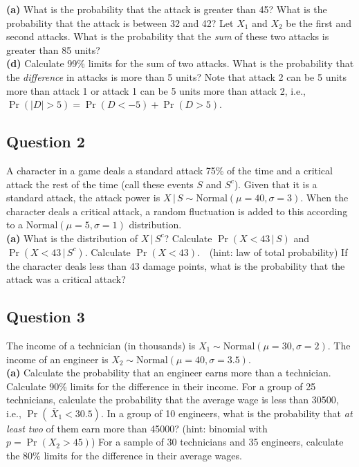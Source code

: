 {\bf(a)} What is the probability that the attack is greater than 45?  What is the probability that the attack is between 32 and 42?  Let $X_1$ and $X_2$ be the first and second attacks. What is the probability that the \emph{sum} of these two attacks is greater than 85 units? \quad \\{\bf(d)} Calculate 99\% limits for the sum of two attacks.   What is the probability that the \emph{difference} in attacks is more than 5 units? Note that attack 2 can be 5 units more than attack 1 or attack 1 can be 5 units more than attack 2, i.e., $\Pr(|D|>5)=\Pr(D<-5) + \Pr(D>5)$.



\subsection*{Question 2}

A character in a game deals a standard attack 75\% of the time and a critical attack the rest of the time (call these events $S$ and $S^c$). Given that it is a standard attack, the attack power is $X\,|\,S \sim \text{Normal}(\mu=40,\sigma=3)$. When the character deals a critical attack, a random fluctuation is added to this according to a $\text{Normal}(\mu=5,\sigma=1)$ distribution.\\[-0.2cm]

{\bf(a)} What is the distribution of $X\,|\,S^c$?  Calculate $\Pr(X<43\,|\,S)$ and $\Pr(X<43\,|\,S^c)$.  Calculate $\Pr(X<43)$. \,\, (hint: law of total probability)  If the character deals less than 43 damage points, what is the probability that the attack was a critical attack?



\subsection*{Question 3}
The income of a technician (in thousands) is $X_1 \sim \text{Normal}(\mu=30,\sigma=2)$. The income of an engineer is $X_2 \sim \text{Normal}(\mu=40,\sigma=3.5)$. \\[-0.2cm]

{\bf(a)} Calculate the probability that an engineer earns more than a technician.  Calculate 90\% limits for the difference in their income.  For a group of 25 technicians, calculate the probability that the average wage is less than 30500, i.e., $\Pr(\,\overline{\!X}_1 < 30.5)$.  In a group of 10 engineers, what is the probability that \emph{at least two} of them earn more than 45000? (hint: binomial with $p = \Pr(X_2 > 45)$)  For a sample of 30 technicians and 35 engineers, calculate the 80\% limits for the difference in their average wages.


